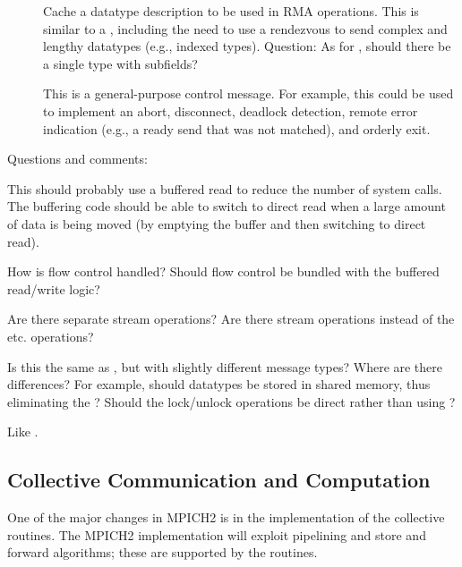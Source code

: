 \documentclass{article}
\begin{document}
\begin{tcp}
\begin{description}
\item[]Cache a datatype description
to be used in RMA operations.  This is similar to a
, including the need to use a
rendezvous to send complex and lengthy datatypes (e.g., indexed
types).
Question: As for , should there be a
single type with subfields?  

\item[]This is a general-purpose control
message.  For example, this could be used to implement an abort,
disconnect, deadlock detection, remote error indication (e.g., a ready
send that was not matched), and orderly exit.
\end{description}

Questions and comments:

This should probably use a buffered read to reduce the number of system
calls.  The buffering code should be able to switch to direct read when a
large amount of data is being moved (by emptying the buffer and then switching
to direct read).  

How is flow control handled?  Should flow control be bundled with the buffered
read/write logic?

Are there separate stream operations?  Are there stream operations
instead of the  etc. operations?
\end{tcp}

\begin{shmem}
Is this the same as \tcpname, but with slightly different message
types?
Where are there differences?  For example, should datatypes be stored
in shared memory, thus eliminating the
?  Should the lock/unlock operations
be direct rather than using ?
\end{shmem}

\begin{via}
Like \shmemname.
\end{via}

\subsection{Collective Communication and Computation}
One of the major changes in MPICH2 is in the implementation of the
collective routines.  The MPICH2 implementation will exploit
pipelining and store and forward algorithms; these are supported by
the  routines.  
\end{document}

